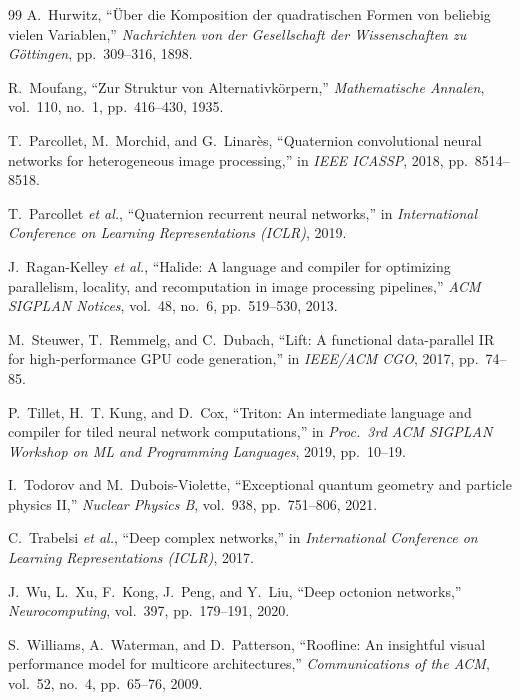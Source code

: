 \documentclass[11pt,a4paper]{article}
\begin{document}
\begin{thebibliography}{99}
A.~Hurwitz, ``\"Uber die Komposition der quadratischen Formen von beliebig vielen Variablen,'' \emph{Nachrichten von der Gesellschaft der Wissenschaften zu G\"ottingen}, pp.~309--316, 1898.

R.~Moufang, ``Zur Struktur von Alternativk\"orpern,'' \emph{Mathematische Annalen}, vol.~110, no.~1, pp.~416--430, 1935.

T.~Parcollet, M.~Morchid, and G.~Linar\`es, ``Quaternion convolutional neural networks for heterogeneous image processing,'' in \emph{IEEE ICASSP}, 2018, pp.~8514--8518.

T.~Parcollet \emph{et al.}, ``Quaternion recurrent neural networks,'' in \emph{International Conference on Learning Representations (ICLR)}, 2019.

J.~Ragan-Kelley \emph{et al.}, ``Halide: A language and compiler for optimizing parallelism, locality, and recomputation in image processing pipelines,'' \emph{ACM SIGPLAN Notices}, vol.~48, no.~6, pp.~519--530, 2013.

M.~Steuwer, T.~Remmelg, and C.~Dubach, ``Lift: A functional data-parallel IR for high-performance GPU code generation,'' in \emph{IEEE/ACM CGO}, 2017, pp.~74--85.

P.~Tillet, H.~T. Kung, and D.~Cox, ``Triton: An intermediate language and compiler for tiled neural network computations,'' in \emph{Proc.\ 3rd ACM SIGPLAN Workshop on ML and Programming Languages}, 2019, pp.~10--19.

I.~Todorov and M.~Dubois-Violette, ``Exceptional quantum geometry and particle physics II,'' \emph{Nuclear Physics B}, vol.~938, pp.~751--806, 2021.

C.~Trabelsi \emph{et al.}, ``Deep complex networks,'' in \emph{International Conference on Learning Representations (ICLR)}, 2017.

J.~Wu, L.~Xu, F.~Kong, J.~Peng, and Y.~Liu, ``Deep octonion networks,'' \emph{Neurocomputing}, vol.~397, pp.~179--191, 2020.

S.~Williams, A.~Waterman, and D.~Patterson, ``Roofline: An insightful visual performance model for multicore architectures,'' \emph{Communications of the ACM}, vol.~52, no.~4, pp.~65--76, 2009.

\end{thebibliography}
\end{document}
